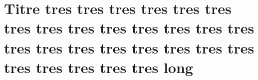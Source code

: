 \documentclass{book}
\begin{document}
\tableofcontents

\chapter{
	Titre tres tres tres tres tres tres tres tres tres 
	tres tres tres tres tres tres tres tres tres tres tres tres 
	tres tres tres tres tres tres long
}

\lipsum[1-10]
\end{document}

